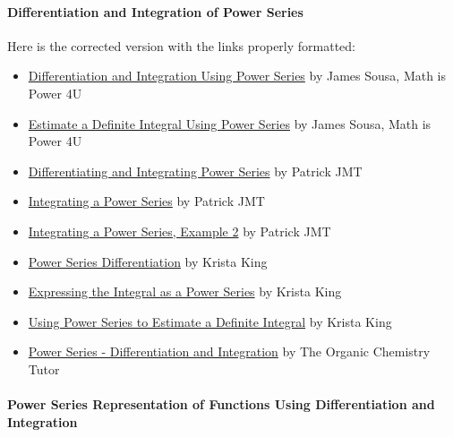 \paragraph{Differentiation and Integration of Power Series}



Here is the corrected version with the links properly formatted:



\begin{itemize}
    \item \href{https://www.youtube.com/watch?v=zCQuEN7TFNE}{Differentiation and Integration Using Power Series} by James Sousa, Math is Power 4U
    \item \href{https://www.youtube.com/watch?v=Ap47feo6xUM}{Estimate a Definite Integral Using Power Series} by James Sousa, Math is Power 4U
    \item \href{https://www.youtube.com/watch?v=qPl9nr8my2Q}{Differentiating and Integrating Power Series} by Patrick JMT
    \item \href{https://www.youtube.com/watch?v=q12rXAMfEXw}{Integrating a Power Series} by Patrick JMT
    \item \href{https://www.youtube.com/watch?v=mGAE8CWH45M}{Integrating a Power Series, Example 2} by Patrick JMT
    \item \href{https://www.youtube.com/watch?v=2dQ4UvCIBV8}{Power Series Differentiation} by Krista King
    \item \href{https://www.youtube.com/watch?v=5p-EH8vP_bU}{Expressing the Integral as a Power Series} by Krista King
    \item \href{https://www.youtube.com/watch?v=GHvPArQIXSg}{Using Power Series to Estimate a Definite Integral} by Krista King
    \item \href{https://www.youtube.com/watch?v=nD6hai32ykQ}{Power Series - Differentiation and Integration} by The Organic Chemistry Tutor
\end{itemize}

\paragraph{Power Series Representation of Functions Using Differentiation and Integration}



